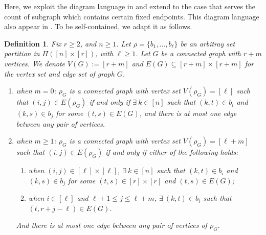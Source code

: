 \documentclass[12pt]{article}
\newtheorem{definition}[prop]{Definition}
\numberwithin{equation}{section}
\begin{document}
Here, we exploit the diagram language in \cite{LiuPrivault23a} and extend to the case that serves the count of subgraph which contains certain fixed endpoints. This diagram language also appear in \cite{LiuPri23b}. To be self-contained, we adapt it as follows.  
\begin{definition}
  Fix $r\ge2$, and $n\ge1$. Let $\rho=\{b_1,\dots,b_\ell\}$ be an arbitray set partition in $\Pi([n]\times[r])$, with $\ell\ge1$. Let $G$ be a connected graph with $r+m$ vertices. We denote $V(G):=[r+m]$ and $E(G)\subseteq[r+m]\times[r+m]$ for the vertex set and edge set of graph $G$.
  \begin{enumerate}
    \item when $m=0$: $\rho_G$ is a connected graph with vertex set $V(\rho_G)=[\ell]$ such that $(i,j)\in E(\rho_G)$ if and only if $\exists ~k\in[n]$ such that $(k,t)\in b_i$ and $(k,s)\in b_j$ for some $(t,s)\in E(G)$, and there is at most one edge between any pair of vertices.
    \item when $m\ge1$: $\rho_G$ is a connected graph with vertex set $V(\rho_G)=[\ell+m]$ such that $(i,j)\in E(\rho_G)$ if and only if either of the following holds:
    \begin{enumerate}
      \item when $(i,j)\in[\ell]\times[\ell]$, $\exists ~k\in[n]$ such that $(k,t)\in b_i$ and $(k,s)\in b_j$ for some $(t,s)\in[r]\times[r]$ and $(t,s)\in E(G)$;
      \item when $i\in[\ell]$ and $\ell+1\le j\le \ell +m$, $\exists ~(k,t)\in b_i$ such that $(t,r+j-\ell)\in E(G)$.
    \end{enumerate}
    And there is at most one edge between any pair of vertices of $\rho_G$.
  \end{enumerate}
\end{definition}
\end{document}
